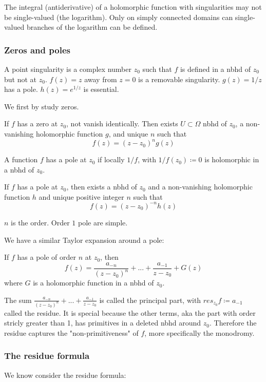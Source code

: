 \documentclass[main.tex]{subfiles}
\begin{document}
The integral (antiderivative) of a holomorphic function with singularities may not be single-valued (the logarithm). Only on simply connected domains can single-valued branches of the logarithm can be defined.

\subsubsection{Zeros and poles}
A point singularity is a complex number $z_0$ such that $f$ is defined in a nbhd of $z_0$ but not at $z_0$. $f(z) = z$ away from $z = 0$ is a removable singularity. $g(z) = 1/z$ has a pole. $h(z) = e^{1/z}$ is essential.

We first by study zeros. 
\begin{theorem}
If $f$ has a zero at $z_0$, not vanish identically. Then exists $U \subset \Omega$ nbhd of $z_0$, a non-vanishing holomorphic function $g$, and unique $n$ such that 
$$
f(z) = (z - z_0)^n g(z)
$$
\end{theorem}

A function $f$ has a pole at $z_0$ if locally $1/f$, with $1/f(z_0) \coloneqq 0$ is holomorphic in a nbhd of $z_0$.

\begin{theorem}
If $f$ has a pole at $z_0$, then exists a nbhd of $z_0$ and a non-vanishing holomorphic function $h$ and unique positive integer $n$ such that 
$$
f(z) = (z-z_0)^{-n} h(z)
$$
\end{theorem}
$n$ is the order. Order $1$ pole are simple.

We have a similar Taylor expansion around a pole:

\begin{theorem}
If $f$ has a pole of order $n$ at $z_0$, then
$$
f(z) = \frac{a_{-n}}{(z-z_0)^n} + ... + \frac{a_{-1}}{z-z_0} + G(z)
$$
where $G$ is a holomorphic function in a nbhd of $z_0$.
\end{theorem}
The sum $\frac{a_{-n}}{(z-z_0)^n} + ... + \frac{a_{-1}}{z-z_0}$ is called the principal part, with $res_{z_0} f \coloneqq a_{-1}$ called the residue. It is special because the other terms, aka the part with order stricly greater than 1, has primitives in a deleted nbhd around $z_0$. Therefore the residue captures the "non-primitiveness" of $f$, more specifically the monodromy.

\subsubsection{The residue formula}
We know consider the residue formula:
\end{document}
